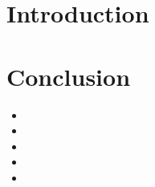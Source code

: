 


\biblio{}

\section*{Introduction}




\section{}
\subsection{}
\subsection{}
\section{}
\subsection{}
\subsection{}
\section{}
\subsection{}
\subsection{}


\section*{Conclusion}



\begin{remarques} \begin{itemize} 
\item 
\item 
\item 
\item 
\item 
\end{itemize} \end{remarques}